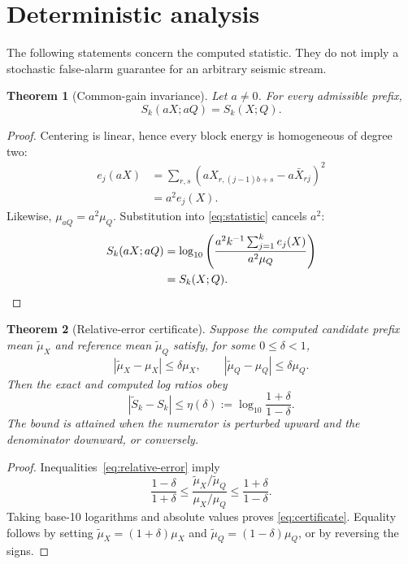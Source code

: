 \documentclass[10pt,letterpaper,twoside]{article}
\newtheorem{theorem}{Theorem}
\begin{document}
\section{Deterministic analysis}

The following statements concern the computed statistic.  They do not imply
a stochastic false-alarm guarantee for an arbitrary seismic stream.

\begin{theorem}[Common-gain invariance]
Let $a\neq0$.  For every admissible prefix,
\begin{equation}
 S_k(aX;aQ)=S_k(X;Q).
\end{equation}
\end{theorem}

\begin{proof}
Centering is linear, hence every block energy is homogeneous of degree two:
\begin{align}
 e_j(aX)
 &=\sum_{r,s}\left(aX_{r,(j-1)b+s}-a\bar X_{rj}\right)^2 \\
 &=a^2 e_j(X).
\end{align}
Likewise, $\mu_{aQ}=a^2\mu_Q$.  Substitution into
\eqref{eq:statistic} cancels $a^2$:
\begin{align}
 S_k(aX;aQ)
 &=\log_{10}\left(
 \frac{a^2 k^{-1}\sum_{j=1}^{k}e_j(X)}{a^2\mu_Q}
 \right) \\
 &=S_k(X;Q). \qedhere
\end{align}
\end{proof}

\begin{theorem}[Relative-error certificate]
Suppose the computed candidate prefix mean $\widetilde\mu_X$ and reference
mean $\widetilde\mu_Q$ satisfy, for some $0\leq\delta<1$,
\begin{equation}
 |\widetilde\mu_X-\mu_X|\leq\delta\mu_X,
 \qquad
 |\widetilde\mu_Q-\mu_Q|\leq\delta\mu_Q.
 \label{eq:relative-error}
\end{equation}
Then the exact and computed log ratios obey
\begin{equation}
 |\widetilde S_k-S_k|
 \leq
 \eta(\delta)
 :=\log_{10}\frac{1+\delta}{1-\delta}.
 \label{eq:certificate}
\end{equation}
The bound is attained when the numerator is perturbed upward and the
denominator downward, or conversely.
\end{theorem}

\begin{proof}
Inequalities~\eqref{eq:relative-error} imply
\begin{equation}
 \frac{1-\delta}{1+\delta}
 \leq
 \frac{\widetilde\mu_X/\widetilde\mu_Q}{\mu_X/\mu_Q}
 \leq
 \frac{1+\delta}{1-\delta}.
\end{equation}
Taking base-10 logarithms and absolute values proves
\eqref{eq:certificate}.  Equality follows by setting
$\widetilde\mu_X=(1+\delta)\mu_X$ and
$\widetilde\mu_Q=(1-\delta)\mu_Q$, or by reversing the signs.
\end{proof}
\end{document}
